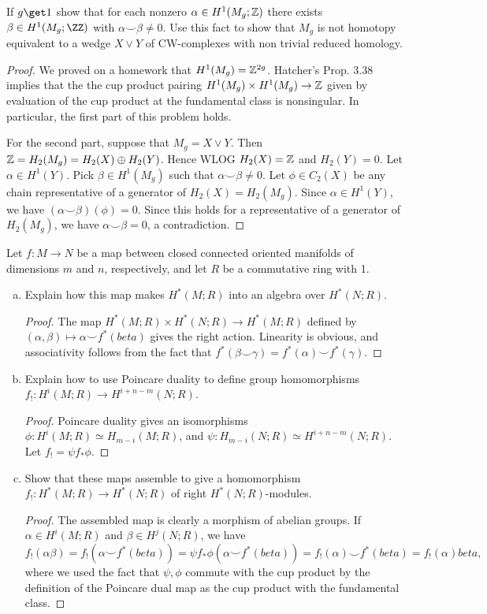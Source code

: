 \documentclass{article}
\begin{document}
 If $g \get 1$ show that for each nonzero $\alpha \in H^1(M_g; \mathbb{Z})$ there exists $\beta \in H^1(M_g;\ZZ)$ with
$\alpha \smile \beta \neq 0$. Use this fact to show that $M_g$ is not homotopy equivalent to a wedge $X \vee Y$ of 
CW-complexes with non trivial reduced homology.

\begin{proof}
We proved on a homework that $H^1(M_g) = \mathbb{Z}^{2g}$. Hatcher's Prop. 3.38 implies that the the cup product pairing
$H^1(M_g) \times H^1(M_g) \to \mathbb{Z}$ given by evaluation of the cup product at the fundamental class is nonsingular. 
In particular, the first part of this problem holds.

For the second part, suppose that $M_g = X \vee Y$. Then $\mathbb{Z} = H_2(M_g) = H_2(X) \oplus H_2(Y)$.  Hence WLOG $H_2(X) = \mathbb{Z}$ and $H_2(Y) = 0$. 
Let $\alpha \in H^1(Y)$. Pick $\beta \in H^1(M_g)$ such that $\alpha \smile \beta \neq 0$.
Let $\phi \in C_2(X)$ be any chain representative of a generator of $H_2(X) = H_2(M_g)$.  Since $\alpha \in H^1(Y)$, we have
$(\alpha \smile \beta)(\phi) = 0$.  Since this holds for a representative of a generator of $H_2(M_g)$, we have $\alpha \smile \beta = 0$, a contradiction.
\end{proof}

 Let $f: M \to N$ be a map between closed connected oriented manifolds of dimensions $m$ and $n$, respectively, and let $R$ be a commutative ring with 1.
\begin{enumerate}[a.]
\item Explain how this map makes $H^*(M; R)$ into an algebra over $H^*(N; R)$.
\begin{proof}
The map $H^*(M; R) \times H^*(N; R) \to  H^*(M; R)$ defined by $(\alpha, \beta) \mapsto \alpha \smile f^*(beta)$ gives the right action. Linearity is obvious, and associativity follows from the fact that $f^*(\beta \smile \gamma) = f^*(\alpha) \smile f^*(\gamma)$.
\end{proof}
\item Explain how to use Poincare duality to define group homomorphisms $f_!: H^i(M;R) \to H^{i+n-m}(N;R)$.
\begin{proof}
Poincare duality gives an isomorphisms $\phi:H^i(M;R) \simeq H_{m-i}(M;R)$, and 
$\psi:H_{m-i}(N;R) \simeq H^{i+n-m}(N;R)$. Let $f_! = \psi f_* \phi$.
\end{proof}
\item Show that these maps assemble to give a homomorphism $f_!:H^*(M;R) \to H^*(N;R)$ of right $H^*(N;R)$-modules.
\begin{proof}
The assembled map is clearly a morphism of abelian groups. If $\alpha \in H^i(M;R)$ and $\beta \in H^j(N;R)$,
we have $f_!(\alpha \beta)= f_!(\alpha \smile f^*(beta)) = \psi f_* \phi (\alpha \smile f^*(beta))
= f_!(\alpha) \smile f^*(beta)
= f_!(\alpha) beta,$ 
where we used the fact that $\psi, \phi$ commute with the cup product by the definition of the Poincare dual map as
the cup product with the fundamental class.
\end{proof}
\end{enumerate}
\end{document}
